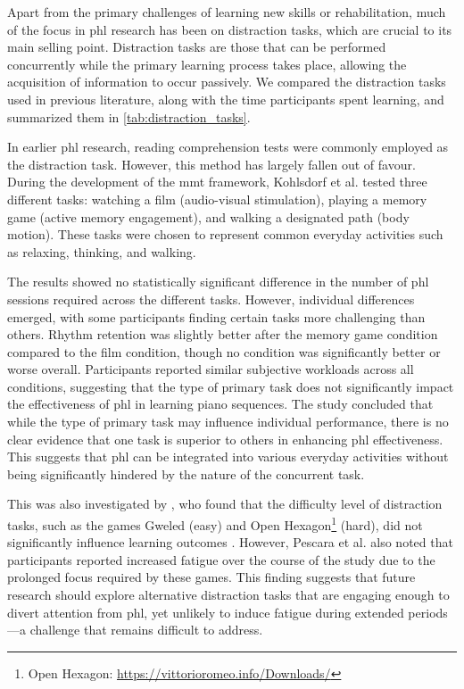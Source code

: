 Apart from the primary challenges of learning new skills or rehabilitation, much of the focus in \gls{phl} research has been on distraction tasks, which are crucial to its main selling point. Distraction tasks are those that can be performed concurrently while the primary learning process takes place, allowing the acquisition of information to occur passively. We compared the distraction tasks used in previous literature, along with the time participants spent learning, and summarized them in \autoref{tab:distraction_tasks}.

In earlier \gls{phl} research, reading comprehension tests \cite{Huang2008, Huang2010, Kohlsdorf2010} were commonly employed as the distraction task. However, this method has largely fallen out of favour. During the development of the \gls{mmt} framework, Kohlsdorf et al. \cite{Kohlsdorf2010} tested three different tasks: watching a film (audio-visual stimulation), playing a memory game (active memory engagement), and walking a designated path (body motion). These tasks were chosen to represent common everyday activities such as relaxing, thinking, and walking.

The results showed no statistically significant difference in the number of \gls{phl} sessions required across the different tasks. However, individual differences emerged, with some participants finding certain tasks more challenging than others. Rhythm retention was slightly better after the memory game condition compared to the film condition, though no condition was significantly better or worse overall. Participants reported similar subjective workloads across all conditions, suggesting that the type of primary task does not significantly impact the effectiveness of \gls{phl} in learning piano sequences. The study concluded that while the type of primary task may influence individual performance, there is no clear evidence that one task is superior to others in enhancing \gls{phl} effectiveness. This suggests that \gls{phl} can be integrated into various everyday activities without being significantly hindered by the nature of the concurrent task.

This was also investigated by \citet{Pescara2019}, who found that the difficulty level of distraction tasks, such as the games Gweled (easy) and Open Hexagon\footnote{Open Hexagon: \url{https://vittorioromeo.info/Downloads/}} (hard), did not significantly influence learning outcomes \cite{Pescara2019}. However, Pescara et al. also noted that participants reported increased fatigue over the course of the study due to the prolonged focus required by these games. This finding suggests that future research should explore alternative distraction tasks that are engaging enough to divert attention from \gls{phl}, yet unlikely to induce fatigue during extended periods—a challenge that remains difficult to address.

